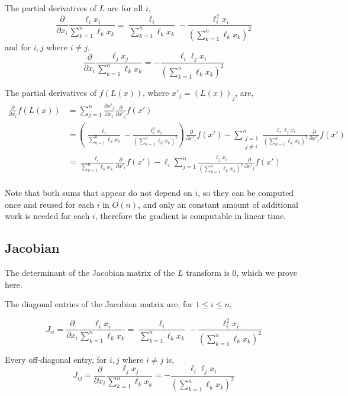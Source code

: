 \documentclass{article}
\begin{document}
The partial derivatives of $L$ are for all $i$,
$$\frac{\partial}{\partial x_i} \frac{\ell_i x_i}{\sum_{k=1}^{n} \ell_k x_k}
= \frac{\ell_i}{\sum_{k=1}^{n} \ell_k x_k}
- \frac{\ell_{i}^2 x_i}{\left( \sum_{k=1}^{n} \ell_k x_k \right)^2}$$
and for $i, j$ where $i \neq j$,
$$\frac{\partial}{\partial x_i} \frac{\ell_j x_j}{\sum_{k=1}^{n} \ell_k x_k}
= - \frac{\ell_i \ell_j x_i}{\left( \sum_{k=1}^{n} \ell_k x_k \right)^2}$$


The partial derivatives of $f(L(x))$, where $x'_j = (L(x))_j$, are,
\begin{align*}
\frac{\partial}{\partial x_i} f(L(x)) &=
    \sum_{j=1}^{n} \frac{\partial x'_j}{\partial x_i} \frac{\partial}{\partial x'_j} f(x') \\
&=
    \left(\frac{\ell_i}{\sum_{k=1}^{n} \ell_k x_k}
    - \frac{\ell_{i}^2 x_i}{\left( \sum_{k=1}^{n} \ell_k x_k \right)^2}\right)
    \frac{\partial}{\partial x'_i} f(x')
    - \sum_{\substack{j=1 \\ j \neq i}}^{n}
\frac{\ell_i \ell_j x_i}{\left( \sum_{k=1}^{n} \ell_k x_k \right)^2}
    \frac{\partial}{\partial x'_j} f(x') \\
    &=
\frac{\ell_i}{\sum_{k=1}^{n} \ell_k x_k}  \frac{\partial}{\partial x'_i} f(x')
- \ell_i \sum_{j=1}^{n}
\frac{\ell_j x_i}{\left( \sum_{k=1}^{n} \ell_k x_k \right)^2}
    \frac{\partial}{\partial x'_j} f(x') \\
\end{align*}

Note that both sums that appear do not depend on $i$, so they can be computed
once and reused for each $i$ in $O(n)$, and only an constant amount of
additional work is needed for each $i$, therefore the gradient is computable in
linear time.

\subsection{Jacobian}

The determinant of the Jacobian matrix of the $L$ transform is 0, which we prove
here.

The diagonal entries of the Jacobian matrix are, for $1 \le i \le n$,

$$J_{ii} = \frac{\partial}{\partial x_i} \frac{\ell_i x_i}{\sum_{k=1}^{n} \ell_k x_k}
= \frac{\ell_i}{\sum_{k=1}^{n} \ell_k x_k}
- \frac{\ell_{i}^2 x_i}{\left( \sum_{k=1}^{n} \ell_k x_k \right)^2}$$

Every off-diagonal entry, for $i, j$ where $i \neq j$ is,
$$J_{ij} = \frac{\partial}{\partial x_i} \frac{\ell_j x_j}{\sum_{k=1}^{n} \ell_k x_k}
= - \frac{\ell_i \ell_j x_i}{\left( \sum_{k=1}^{n} \ell_k x_k \right)^2}$$
\end{document}
